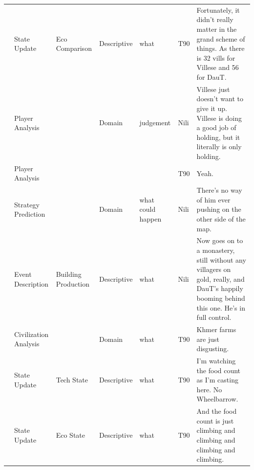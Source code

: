 {\begin{longtable}{@{}>{\theAppRow}r|L{2.3cm}L{2.2cm}L{1.4cm}L{2.2cm}L{0.5cm}U{5.6cm}@{}}
    & State Update          &  Eco Comparison                    & Descriptive   & what              & T90     & Fortunately, it didn't really matter in the grand scheme of things. As there is 32 vills for Villese and 56 for DauT.                                                                                                    \\
    & Player Analysis       &                      & Domain      & judgement         & Nili    & Villese just doesn't want to give it up. Villese is doing a good job of holding, but it literally is only holding.                                                                                                       \\
    & Player Analysis       &                      &             &                   & T90     & Yeah.                                                                                                                                                                                                                    \\
    & Strategy Prediction   &                      & Domain      & what could happen & Nili    & There's no way of him ever pushing on the other side of the map.                                                                                                                                                           \\
    & Event Description     & Building Production  & Descriptive   & what              & Nili    & Now goes on to a monastery, still without any villagers on gold, really, and DauT's happily booming behind this one. He's in full control.                                                                               \\
    & Civilization Analysis &                      & Domain      & what              & T90     & Khmer farms are just disgusting.                                                                                                                                                                                         \\
    & State Update          & Tech State          & Descriptive   & what              & T90     & I'm watching the food count as I'm casting here. No Wheelbarrow.                                                                                                                                                         \\
    & State Update          & Eco State            & Descriptive   & what              & T90     & And the food count is just climbing and climbing and climbing and climbing.                                                                                                                                              \\

\end{longtable}}
